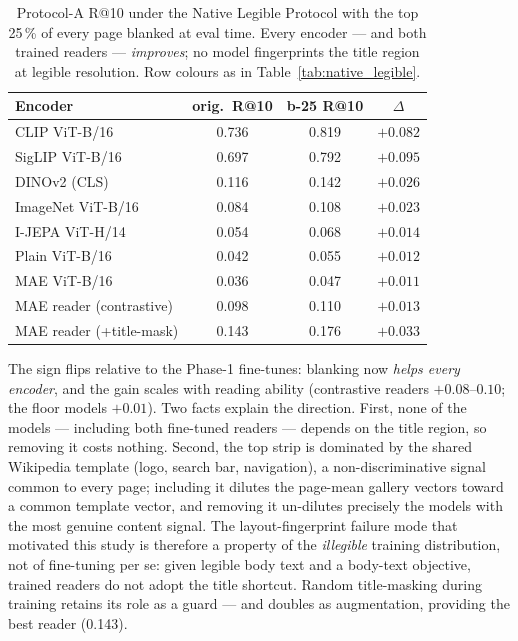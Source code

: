 \documentclass{article}
\begin{document}
\begin{table}[t]
\caption{Protocol-A R@10 under the Native Legible Protocol with
the top 25\,\% of every page blanked at eval time. Every encoder
--- and both trained readers --- \emph{improves}; no model
fingerprints the title region at legible resolution. Row colours
as in Table~\ref{tab:native_legible}.}
\label{tab:legible_blank}
\centering
\small
\begin{tabular}{lccc}
\toprule
Encoder & orig.\ R@10 & b-25 R@10 & $\Delta$ \\
\midrule
\rowcolor{cITC} CLIP ViT-B/16    & 0.736 & 0.819 & $+0.082$ \\
\rowcolor{cITC} SigLIP ViT-B/16  & 0.697 & 0.792 & $+0.095$ \\
\rowcolor{cSSL} DINOv2 (CLS)     & 0.116 & 0.142 & $+0.026$ \\
\rowcolor{cSUP} ImageNet ViT-B/16 & 0.084 & 0.108 & $+0.023$ \\
\rowcolor{cSSL} I-JEPA ViT-H/14  & 0.054 & 0.068 & $+0.014$ \\
\rowcolor{cRND} Plain ViT-B/16   & 0.042 & 0.055 & $+0.012$ \\
\rowcolor{cSSL} MAE ViT-B/16     & 0.036 & 0.047 & $+0.011$ \\
\midrule
\rowcolor{cFT} MAE reader (contrastive) & 0.098 & 0.110 & $+0.013$ \\
\rowcolor{cFT} MAE reader (+title-mask) & 0.143 & 0.176 & $+0.033$ \\
\bottomrule
\end{tabular}
\end{table}

The sign flips relative to the Phase-1 fine-tunes: blanking now
\emph{helps every encoder}, and the gain scales with reading
ability (contrastive readers $+0.08$--$0.10$; the floor models
$+0.01$). Two facts explain the direction. First, none of the
models --- including both fine-tuned readers --- depends on the
title region, so removing it costs nothing. Second, the top strip
is dominated by the shared Wikipedia template (logo, search bar,
navigation), a non-discriminative signal common to every page;
including it dilutes the page-mean gallery vectors toward a
common template vector, and removing it un-dilutes precisely the
models with the most genuine content signal. The layout-fingerprint
failure mode that motivated this study is therefore a property of
the \emph{illegible} training distribution, not of fine-tuning per
se: given legible body text and a body-text objective, trained
readers do not adopt the title shortcut. Random title-masking
during training retains its role as a guard --- and doubles as
augmentation, providing the best reader (0.143).
\end{document}
